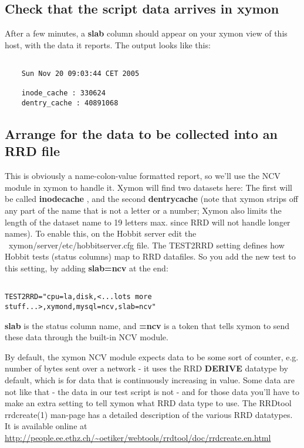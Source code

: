 \subsection{Check that the script data arrives in xymon}


 After a few minutes, a \textbf{slab}
 column should appear on your xymon view of this host, with the data it reports. The output looks like this: \begin{verbatim}

	Sun Nov 20 09:03:44 CET 2005

	inode_cache : 330624
	dentry_cache : 40891068

\end{verbatim}

\subsection{Arrange for the data to be collected into an RRD file}


 This is obviously a name-colon-value formatted report, so we'll use the NCV module in xymon to handle it. Xymon will find two datasets here: The first will be called \textbf{inodecache}
, and the second \textbf{dentrycache}
 (note that xymon strips off any part of the name that is not a letter or a number; Xymon also limits the length of the dataset name to 19 letters max. since RRD will not handle longer names). To enable this, on the Hobbit server edit the ~xymon/server/etc/hobbitserver.cfg file. The TEST2RRD setting defines how Hobbit tests (status columns) map to RRD datafiles. So you add the new test to this setting, by adding \textbf{slab=ncv}
 at the end: \begin{verbatim}

TEST2RRD="cpu=la,disk,<...lots more stuff...>,xymond,mysql=ncv,slab=ncv"

\end{verbatim}



 \textbf{slab}
 is the status column name, and \textbf{=ncv}
 is a token that tells xymon to send these data through the built-in NCV module.


 By default, the xymon NCV module expects data to be some sort of counter, e.g. number of bytes sent over a network - it uses the RRD \textbf{DERIVE}
 datatype by default, which is for data that is continuously increasing in value. Some data are not like that - the data in our test script is not - and for those data you'll have to make an extra setting to tell xymon what RRD data type to use. The RRDtool rrdcreate(1) man-page has a detailed description of the various RRD datatypes. It is available online at  \url{http://people.ee.ethz.ch/~oetiker/webtools/rrdtool/doc/rrdcreate.en.html}


